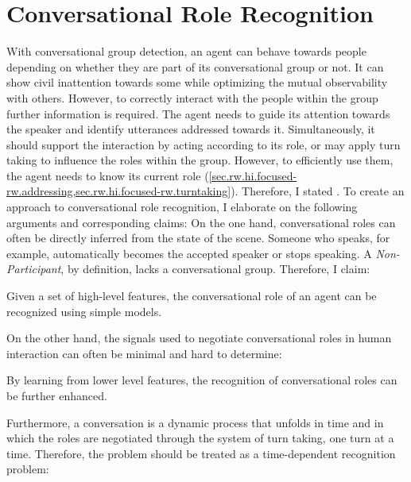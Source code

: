 \chapter{Conversational Role Recognition}\label{ch.roles}

With \gls{conversational group} detection, an agent can behave towards people depending on whether they are part of its \gls{conversational group} or not.
It can show \gls{civil inattention} towards some while optimizing the mutual observability with others.
However, to correctly interact with the people within the group further information is required.
The agent needs to guide its attention towards the \gls{speaker} and identify utterances addressed towards it. 
Simultaneously, it should support the interaction by acting according to its role, or may apply \gls{turn taking} to influence the roles within the group.
However, to efficiently use them, the agent needs to know its current role (\cref{sec.rw.hi.focused-rw.addressing,sec.rw.hi.focused-rw.turntaking}). 
Therefore, I stated .
To create an approach to \gls{conversational role} recognition, I elaborate on the following arguments and corresponding claims:
On the one hand, \glspl{conversational role} can often be directly inferred from the state of the scene.
Someone who speaks, for example, automatically becomes the accepted \gls{speaker} or stops speaking.
A \emph{Non-Participant}, by definition, lacks a \gls{conversational group}.
Therefore, I claim:
\newcommand{\hyprolerule}{Given a set of high-level features, the \gls{conversational role} of an agent can be recognized using simple models.}
\begin{hyp3}
    \label{role.rule}
    \hyprolerule
\end{hyp3}
On the other hand, the signals used to negotiate \glspl{conversational role} in human interaction can often be minimal and hard to determine:
\newcommand{\hyproleraw}{By learning from lower level features, the recognition of \glspl{conversational role} can be further enhanced.}
\begin{hyp3}
    \label{role.raw}
    \hyproleraw
\end{hyp3}
Furthermore, a \gls{conversation} is a dynamic process that unfolds in time and in which the roles are negotiated through the system of \gls{turn} taking, one \gls{turn} at a time.
Therefore, the problem should be treated as a time-dependent recognition problem:
\newcommand{\hyproletime}{By observing how the interaction unfolds in time, the \gls{conversational role} can be better recognized than from the latest observation alone.}
